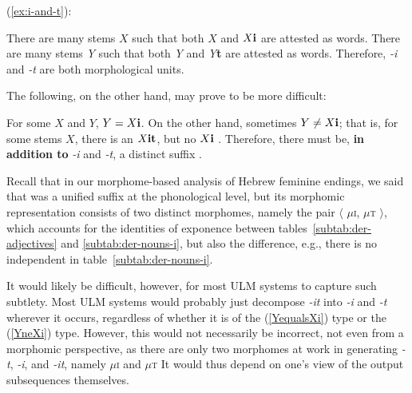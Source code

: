 (\ref{ex:i-and-t}): 
\begin{exe} \label{ex:observations1}
\ex There are many stems $X$ such that both $X$ and $X\text{\textbf{i}}$ are 
attested as words. \label{ex:Xi}
 \ex There are many stems \textit{Y} such that both \textit{Y} and \textit{Y}\textbf{t} 
 are attested as words. \label{ex:Yi}
\ex Therefore, \textit{-i} and \textit{-t} are both morphological units. \label{ex:i-and-t}
\end{exe}

The following, on the other hand, may prove to be more difficult:
\begin{exe} \label{ex:observations2}
\ex  For some $X$ and $Y$, $Y=X\text{\textbf{i}}$. \label{ex:YequalsXi} 
\ex  On the other hand, sometimes $Y \ne X\text{\textbf{i}}$; that is, for some stems 
$X$, there is an $X\text{\textbf{it}}$, but no $X\text{\textbf{i}}$ . \label{YneXi}
\ex Therefore, there must be, \textbf{in addition to} \textit{-i} and \textit{-t}, 
a distinct suffix .
\end{exe}
Recall that in our morphome-based analysis of Hebrew feminine endings, we said 
that  was a unified suffix at the phonological level, but its morphomic 
representation consists of two distinct morphomes, namely the pair 
$\langle$ $\mu$\textsc{i}, $\mu$\textsc{t} $\rangle$, which accounts
for the identities of exponence between tables~\ref{subtab:der-adjectives} 
and \ref{subtab:der-nouns-i}, but also the difference, e.g., there is no independent
 in table~\ref{subtab:der-nouns-i}.

It would likely be difficult, however, for most \ac{ULM} systems to capture such subtlety. 
Most \ac{ULM} systems would probably just decompose \textit{-it} 
into \textit{-i} and \textit{-t} wherever it occurs, regardless of whether it is of the
 (\ref{YequalsXi}) type or the (\ref{YneXi}) type. However, 
 this would not necessarily be incorrect, not even from a morphomic perspective,
 as there are only two morphomes at work in generating \textit{-t}, \textit{-i}, and \textit{-it}, 
 namely $\mu$\textsc{i} and $\mu$\textsc{t} 
It would thus depend on one's view of the output subsequences themselves.

